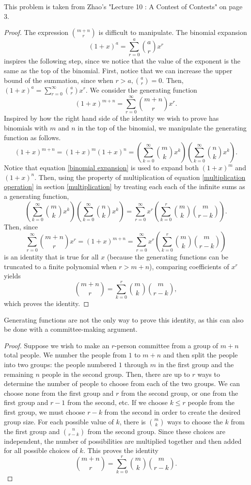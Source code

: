 \documentclass[12pt]{article}
\begin{document}
This problem is taken from Zhao's "Lecture 10 : A Contest of Contests" on page 3.
\begin{proof}
The expression $\binom{m+n}{r}$ is difficult to manipulate. The binomial expansion \begin{equation}\label{binomial expansion}(1+x)^a = \sum_{r=0}^a \binom{a}{r} x^r\end{equation} inspires the following step, since we notice that the value of the exponent is the same as the top of the binomial. First, notice that we can increase the upper bound of the summation, since when $r>a, \binom{a}{r}=0$. Then, $(1+x)^a = \sum_{r=0}^\infty \binom{a}{r} x^r$. We consider the generating function \[(1+x)^{m+n}=\sum_{r=0}^\infty \binom{m+n}{r}x^r.\]
Inspired by how the right hand side of the identity we wish to prove has binomials with $m$ and $n$ in the top of the binomial, we manipulate the generating function as follows.
\[(1+x)^{m+n}=(1+x)^m (1+x)^n = \left(\sum_{k=0}^\infty \binom{m}{k} x^k\right)\left(\sum_{k=0}^\infty \binom{n}{k} x^k\right).\] Notice that equation \ref{binomial expansion} is used to expand both $(1+x)^m$ and $(1+x)^n$. Then, using the property of multiplication of equation \ref{multiplication operation} in section \ref{multiplication} by treating each each of the infinite sums as a generating function,
\[\left(\sum_{k=0}^\infty \binom{m}{k} x^k\right)\left(\sum_{k=0}^\infty \binom{n}{k} x^k\right) = \sum_{r=0}^\infty x^r\left(\sum_{k=0}^r \binom{m}{k}\binom{m}{r-k}\right).\]
Then, since \[\sum_{r=0}^\infty \binom{m+n}{r}x^r = (1+x)^{m+n} = \sum_{r=0}^\infty x^r\left(\sum_{k=0}^r \binom{m}{k}\binom{m}{r-k}\right)\] is an identity that is true for all $x$ (because the generating functions can be truncated to a finite polynomial when $r>m+n$), comparing coefficients of $x^r$ yields \[\binom{m+n}{r} = \sum_{k=0}^r \binom{m}{k}\binom{m}{r-k},\] which proves the identity. 
\end{proof}

Generating functions are not the only way to prove this identity, as this can also be done with a committee-making argument.
\begin{proof} Suppose we wish to make an $r$-person committee from a group of $m+n$ total people. We number the people from $1$ to $m+n$ and then split the people into two groups: the people numbered $1$ through $m$ in the first group and the remaining $n$ people in the second group. Then, there are up to $r$ ways to determine the number of people to choose from each of the two groups. We can choose none from the first group and $r$ from the second group, or one from the first group and $r-1$ from the second, etc. If we choose $k\le r$ people from the first group, we must choose $r-k$ from the second in order to create the desired group size. For each possible value of $k$, there is $\binom{m}{k}$ ways to choose the $k$ from the first group and $\binom{n}{r-k}$ from the second group. Since these choices are independent, the number of possibilities are multiplied together and then added for all possible choices of $k$. This proves the identity \[\binom{m+n}{r} = \sum_{k=0}^r \binom{m}{k}\binom{m}{r-k}.\] \end{proof}
\end{document}

